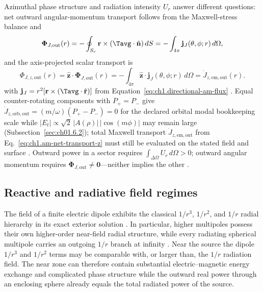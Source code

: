 Azimuthal phase structure and radiation intensity $U_r$ answer different questions: net outward angular-momentum transport follows from the Maxwell-stress balance and
\begin{equation}
\label{eq:ch1.am-net-transport-condition}
\boldsymbol{\Phi}_{J,\mathrm{out}}(r)=-\oint_{S_r}\mathbf{r}\times(\Tavg\cdot\hat{\mathbf{n}})\,dS
=-\int_{4\pi}\mathbf{j}_J(\theta,\phi;r)\,d\Omega,
\end{equation}
and the axis-projected scalar transport is
\begin{equation}
\label{eq:ch1.am-net-transport-z}
\Phi_{J,z,\mathrm{out}}(r)=\hat{\mathbf{z}}\cdot\boldsymbol{\Phi}_{J,\mathrm{out}}(r)
=-\int_{4\pi}\hat{\mathbf{z}}\cdot\mathbf{j}_J(\theta,\phi;r)\,d\Omega
=\dot J_{z,\mathrm{em,out}}(r).
\end{equation}
with $\mathbf{j}_J=r^2[\mathbf{r}\times(\Tavg\cdot\hat{\mathbf{r}})]$ from Equation~\eqref{eq:ch1.directional-am-flux} \cite{stratton1941,beth1936}. Equal counter-rotating components with $P_+=P_-$ give $\dot J_{z,\mathrm{orb,out}}=(m/\omega)(P_+-P_-)=0$ for the declared orbital modal bookkeeping scale while $|E_t|\propto\sqrt{2}\,|A(\rho)|\,|\cos(m\phi)|$ may remain large (Subsection~\ref{sec:ch01.6.2}); total Maxwell transport $\dot J_{z,\mathrm{em,out}}$ from Eq.~\eqref{eq:ch1.am-net-transport-z} must still be evaluated on the stated field and surface \cite{allen1992,stratton1941}. Outward power in a sector requires $\int_{\Delta\Omega}U_r\,d\Omega>0$; outward angular momentum requires $\boldsymbol{\Phi}_{J,\mathrm{out}}\neq\mathbf{0}$---neither implies the other \cite{poynting1884}.
\label{eq:ch1.flux-qualified-decision}%
\label{eq:ch1.transport-charge-continuous-index}%
\label{tab:ch1.triad-numeric-dipole}

\subsection{Reactive and radiative field regimes}
\label{sec:ch01.2.4}

The field of a finite electric dipole exhibits the classical $1/r^3$, $1/r^2$, and $1/r$ radial hierarchy in its exact exterior solution \cite{stratton1941}. In particular, higher multipoles possess their own higher-order near-field radial structure, while every radiating spherical multipole carries an outgoing $1/r$ branch at infinity \cite{stratton1941,hansen1988}. Near the source the dipole $1/r^3$ and $1/r^2$ terms may be comparable with, or larger than, the $1/r$ radiation field. The near zone can therefore contain substantial electric--magnetic energy exchange and complicated phase structure while the outward real power through an enclosing sphere already equals the total radiated power of the source.


